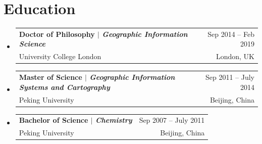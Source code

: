 \documentclass[A4,11pt]{article}
\makeatletter
\newcommand{\CVSubheading}[4]{
  \vspace{-2pt}\item
    \begin{tabular*}{0.97\textwidth}[t]{l@{\extracolsep{\fill}}r}
      \textbf{#1} & #2 \\
      \small#3 & \small #4 \\
    \end{tabular*}\vspace{-7pt}
}
\newcommand{\CVSubHeadingListStart}{\begin{itemize}[leftmargin=0.5cm, label={}]}
\newcommand{\CVSubHeadingListEnd}{\end{itemize}}
\makeatother
\begin{document}

\section{Education}
  \CVSubHeadingListStart
    \CVSubheading
      {{Doctor of Philosophy $|$ \emph{\small{Geographic Information Science}}}}{Sep 2014 -- Feb 2019}
      {University College London}{London, UK}
    \CVSubheading
      {{Master of Science $|$ \emph{\small{Geographic Information Systems and Cartography}}}}{Sep 2011 -- July 2014}
      {Peking University}{Beijing, China}
    \CVSubheading
      {{Bachelor of Science $|$ \emph{\small{Chemistry}}}}{Sep 2007 -- July 2011}
      {Peking University}{Beijing, China} 
  \CVSubHeadingListEnd

\end{document}

